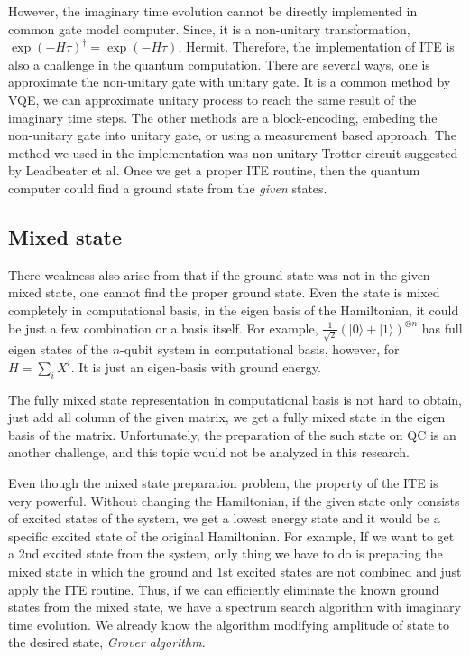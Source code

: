 \documentclass[twocolumn]{article}
\begin{document}
However, the imaginary time evolution cannot be directly 
implemented in common gate model computer. 
Since, it is a non-unitary transformation, $\exp(-H \tau)^\dagger = \exp(-H \tau)$, Hermit. 
Therefore, the implementation of ITE is also a challenge in the quantum computation.
There are several ways, one is approximate the non-unitary gate with unitary gate.
It is a common method by VQE, we can approximate unitary process to reach the same result 
of the imaginary time steps. 
The other methods are a block-encoding, embeding the non-unitary gate into unitary gate, or
using a measurement based approach. 
The method we used in the implementation was non-unitary Trotter circuit suggested by Leadbeater et al\cite{leadbeater_non-unitary_2023}.
Once we get a proper ITE routine, then the quantum computer could find a ground state from 
the \textit{given} states.

\subsection{Mixed state}

There weakness also arise from that if the ground state was not in the 
given mixed state, one cannot find the proper ground state.
Even the state is mixed completely in computational basis,
in the eigen basis of the Hamiltonian, it could be just a few combination
or a basis itself.
For example, $\frac{1}{\sqrt{2}}(|0\rangle + |1\rangle)^{\otimes n}$
has full eigen states of the $n$-qubit system in computational basis, 
however, for $H= \sum_i X^i$. It is just an eigen-basis with ground energy.

The fully mixed state representation in computational basis 
is not hard to obtain, just add all column of the given matrix, 
we get a fully mixed state in the eigen basis of the matrix.
Unfortunately, the preparation of the such state on QC is an another 
challenge, and this topic would not be analyzed in this research.


Even though the mixed state preparation problem, the property of the ITE is very powerful. 
Without changing the Hamiltonian,
if the given state only consists of excited states of the system, 
we get a lowest energy state and it would be a specific excited state of 
the original Hamiltonian.
For example, If we want to get a 2nd excited state from the system, 
only thing we have to do is preparing the mixed state in which the ground and 1st excited states are not combined
and just apply the ITE routine.
Thus, if we can efficiently eliminate the known ground states from 
the mixed state, we have a spectrum search algorithm with imaginary time evolution.
We already know the algorithm modifying amplitude of state to the desired state, \textit{Grover algorithm}.
\end{document}
